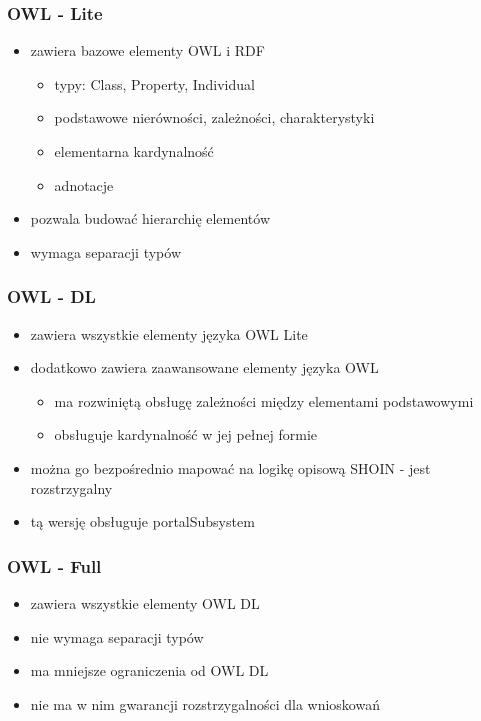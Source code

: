 \documentclass{beamer}
\begin{document}
\begin{frame}
\frametitle{OWL - Lite}
 \begin{itemize}
 \item zawiera bazowe elementy OWL i RDF
	\begin{itemize}
	\item typy: Class, Property, Individual
	\item podstawowe nierówności, zależności, charakterystyki
	\item elementarna kardynalność
	\item adnotacje
\end{itemize}
\item pozwala budować hierarchię elementów
\item wymaga separacji typów
\end{itemize}
\end{frame}
\begin{frame}
\frametitle{OWL - DL}
\begin{itemize}
	\item zawiera wszystkie elementy języka OWL Lite
	\item dodatkowo zawiera zaawansowane elementy języka OWL
		\begin{itemize}
 		\item ma rozwiniętą obsługę zależności między elementami podstawowymi
		\item obsługuje kardynalność w jej pełnej formie
		\end{itemize}
	\item można go bezpośrednio mapować na logikę opisową SHOIN - jest rozstrzygalny
	\item tą wersję obsługuje portalSubsystem
	\end{itemize}

\end{frame}
\begin{frame}
\frametitle{OWL - Full}


\begin{itemize}
	\item zawiera wszystkie elementy OWL DL
	\item nie wymaga separacji typów
	\item ma mniejsze ograniczenia od OWL DL
	\item nie ma w nim gwarancji rozstrzygalności dla wnioskowań
	\end{itemize}
\end{frame}
\end{document}
